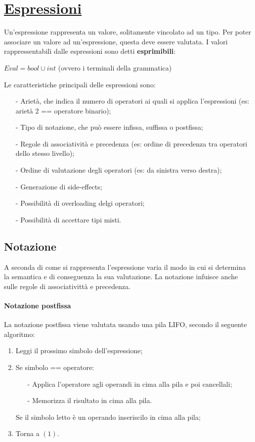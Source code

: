 \documentclass[a4paper, 10pt]{report}
\begin{document}
\section*{\underline{Espressioni}}

Un'espressione rappresenta un valore, solitamente vincolato ad un tipo. Per poter associare un valore ad un'espressione, questa deve essere valutata. I valori rappressentabili dalle espressioni sono detti \textbf{esprimibili}:
\begin{center}
$Eval = bool \cup int$ (ovvero i terminali della grammatica)
\end{center}

\noindent Le caratteristiche principali delle espressioni sono:
\begin{itemize}
\item[-] Arietà, che indica il numero di operatori ai quali si applica l'espressioni (es: arietà 2 == operatore binario);
\item[-] Tipo di notazione, che può essere infissa, suffissa o postfissa;
\item[-] Regole di associatività e precedenza (es: ordine di precedenza tra operatori dello stesso livello);
\item[-] Ordine di valutazione degli operatori (es: da sinistra verso destra);
\item[-] Generazione di side-effects;
\item[-] Possibilità di overloading delgi operatori;
\item[-] Possibilità di accettare tipi misti.
\end{itemize}

\subsection*{Notazione}

A seconda di come si rappresenta l'espressione varia il modo in cui si determina la semantica e di conseguenza la sua valutazione. La notazione infuisce anche sulle regole di associativittà e precedenza.

\paragraph*{Notazione postfissa} La notazione postfissa viene valutata usando una pila LIFO, secondo il seguente algoritmo:
\begin{enumerate}
\item Leggi il prossimo simbolo dell'espressione;
\item Se simbolo == operatore:
	\begin{itemize}
	\item[-] Applica l'operatore agli operandi  in cima alla pila e poi cancellali;
	\item[-] Memorizza il risultato in cima alla pila.
	\end{itemize}
	Se il simbolo letto è un operando inseriscilo in cima alla pila;
\item Torna a $(1)$.
\end{enumerate}
\end{document}
